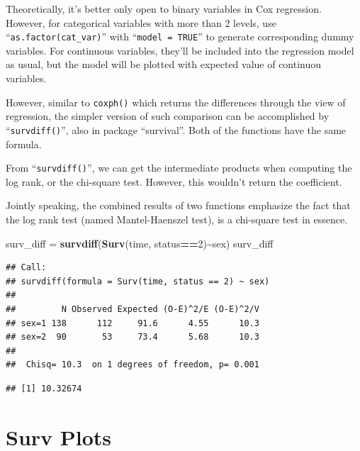 \documentclass[
]{ctexart}
\newenvironment{Shaded}{\begin{snugshade}}{\end{snugshade}}
\newcommand{\DecValTok}[1]{\textcolor[rgb]{0.00,0.00,0.81}{#1}}
\newcommand{\FunctionTok}[1]{\textcolor[rgb]{0.13,0.29,0.53}{\textbf{#1}}}
\newcommand{\NormalTok}[1]{#1}
\newcommand{\OtherTok}[1]{\textcolor[rgb]{0.56,0.35,0.01}{#1}}
\newcommand{\SpecialCharTok}[1]{\textcolor[rgb]{0.81,0.36,0.00}{\textbf{#1}}}
\begin{document}
Theoretically, it's better only open to binary variables in Cox
regression. However, for categorical variables with more than 2 levels,
use ``\texttt{as.factor(cat\_var)}'' with ``\texttt{model\ =\ TRUE}'' to
generate corresponding dummy variables. For continuous variables,
they'll be included into the regression model as usual, but the model
will be plotted with expected value of continuou variables.

However, similar to \texttt{coxph()} which returns the differences
through the view of regression, the simpler version of such comparison
can be accomplished by ``\texttt{survdiff()}'', also in package
``survival''. Both of the functions have the same formula.

From ``\texttt{survdiff()}'', we can get the intermediate products when
computing the log rank, or the chi-square test. However, this wouldn't
return the coefficient.

Jointly speaking, the combined results of two functions emphasize the
fact that the log rank test (named Mantel-Haenszel test), is a
chi-square test in essence.

\begin{Shaded}
\begin{Highlighting}[]
\NormalTok{surv\_diff }\OtherTok{=} \FunctionTok{survdiff}\NormalTok{(}\FunctionTok{Surv}\NormalTok{(time, status}\SpecialCharTok{==}\DecValTok{2}\NormalTok{)}\SpecialCharTok{\textasciitilde{}}\NormalTok{sex)}
\NormalTok{surv\_diff}
\end{Highlighting}
\end{Shaded}

\begin{verbatim}
## Call:
## survdiff(formula = Surv(time, status == 2) ~ sex)
## 
##         N Observed Expected (O-E)^2/E (O-E)^2/V
## sex=1 138      112     91.6      4.55      10.3
## sex=2  90       53     73.4      5.68      10.3
## 
##  Chisq= 10.3  on 1 degrees of freedom, p= 0.001
\end{verbatim}

\begin{Shaded}
\end{Shaded}

\begin{verbatim}
## [1] 10.32674
\end{verbatim}

\hypertarget{surv-plots}{%
\section{Surv Plots}\label{surv-plots}}
\end{document}
